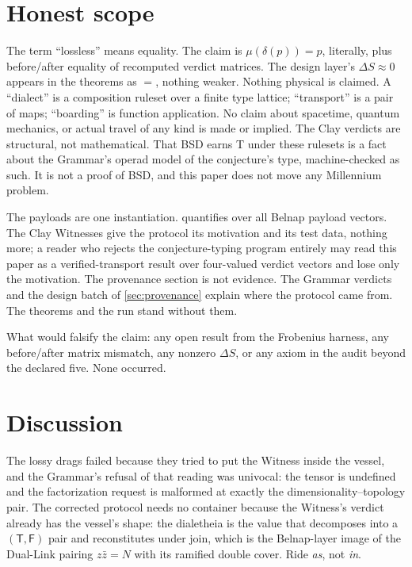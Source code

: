 \documentclass[12pt,a4paper]{article}
\newcommand{\bT}{\textsf{T}}
\newcommand{\bF}{\textsf{F}}
\begin{document}
\section{Honest scope}
\label{sec:scope}

The term ``lossless'' means equality.  The claim is $\mu(\delta(p)) = p$,
literally, plus before/after equality of recomputed verdict matrices.  The design
layer's $\Delta S \approx 0$ appears in the theorems as $=$, nothing weaker.
Nothing physical is claimed.  A ``dialect'' is a composition ruleset over a finite
type lattice; ``transport'' is a pair of maps; ``boarding'' is function
application.  No claim about spacetime, quantum mechanics, or actual travel of
any kind is made or implied.  The Clay verdicts are structural, not mathematical.
That BSD earns \bT{} under these rulesets is a fact about the Grammar's operad
model of the conjecture's type, machine-checked as such.  It is not a proof of
BSD, and this paper does not move any Millennium problem.

The payloads are one instantiation.   quantifies over all
Belnap payload vectors.  The Clay Witnesses give the protocol its motivation and
its test data, nothing more; a reader who rejects the conjecture-typing program
entirely may read this paper as a verified-transport result over four-valued
verdict vectors and lose only the motivation.  The provenance section is not
evidence.  The Grammar verdicts and the design batch of \cref{sec:provenance}
explain where the protocol came from.  The theorems and the run stand without
them.

What would falsify the claim: any open result from the Frobenius harness, any
before/after matrix mismatch, any nonzero $\Delta S$, or any axiom in the audit
beyond the declared five.  None occurred.

\section{Discussion}

The lossy drags failed because they tried to put the Witness inside the vessel,
and the Grammar's refusal of that reading was univocal: the tensor is undefined
and the factorization request is malformed at exactly the dimensionality--topology
pair.  The corrected protocol needs no container because the Witness's verdict
already has the vessel's shape: the dialetheia is the value that decomposes into
a $(\bT,\bF)$ pair and reconstitutes under join, which is the Belnap-layer image
of the Dual-Link pairing $z\bar{z} = N$ with its ramified double cover.  Ride
\emph{as}, not \emph{in}.
\end{document}

